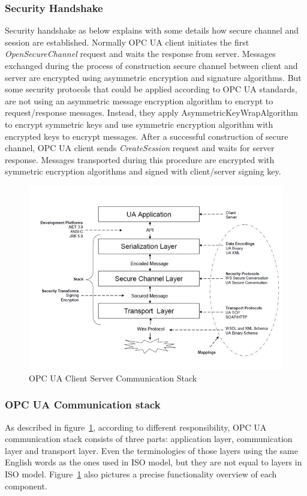 \documentclass[]{llncs}
\begin{document}
\subsubsection{Security Handshake}
Security handshake as below explains with some details how secure channel and session are established. Normally OPC UA client initiates the first \emph{OpenSecureChannel} request and waits the response from server. Messages exchanged during the process of construction secure channel between client and server are encrypted using asymmetric encryption and signature algorithms. But some security protocols that could be applied according to OPC UA standards, are not using an asymmetric message encryption algorithm to encrypt to request/response messages. Instead, they apply AsymmetricKeyWrapAlgorithm to encrypt symmetric keys and use symmetric encryption algorithm with encrypted keys to encrypt messages. After a successful construction of secure channel, OPC UA client sends \emph{CreateSession} request and waits for server response. Messages transported during this procedure are encrypted with symmetric encryption algorithms and signed with client/server signing key.
\begin{figure}[!htbp]
	\centering
	\includegraphics[width=1\textwidth]{opc_ua_commstack.jpg}
		\caption[ ]{OPC UA Client Server Communication Stack\cite{O2}}
	\label{fig:opc_ua_commstack}
\end{figure}

\subsubsection{OPC UA Communication stack}
As described in figure~\ref{fig:opc_ua_commstack}, according to different responsibility, OPC UA communication stack consists of three parts: application layer, communication layer and transport layer. Even the terminologies of those layers using the same English words as the ones used in ISO model, but they are not equal to layers in ISO model. Figure~\ref{fig:opc_ua_commstack} also pictures a precise functionality overview of each component.
\end{document}
